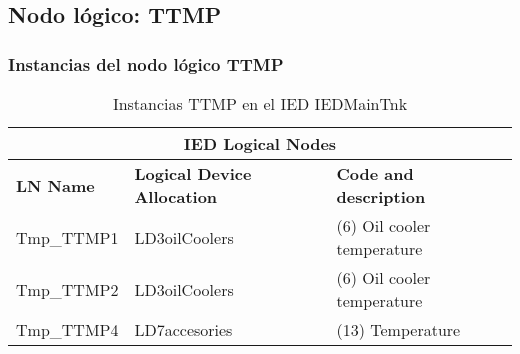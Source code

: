 
\subsection{Nodo l\'ogico: 			 TTMP}

    \subsubsection{Instancias del nodo l\'ogico TTMP}
    \begin{table}[H]
    \begin{center}
    \begin{tabular}{|l|l|p{6.8cm}|}
            \hline
            \multicolumn{3}{|c|}{\cellcolor[gray]{0.8} \textbf{IED Logical Nodes} } \\
            \hline
            \textbf{LN Name} & \textbf{Logical Device Allocation} & \textbf{Code and description} \\
            \hline
            Tmp\_TTMP1 & LD3oilCoolers & (6) Oil cooler temperature \\
            \hline
            Tmp\_TTMP2 & LD3oilCoolers & (6) Oil cooler temperature \\
            \hline
            Tmp\_TTMP4 & LD7accesories & (13) Temperature \\
            \hline
    \end{tabular}
    \caption{Instancias TTMP en el IED IEDMainTnk}
    \label{table:lnInstTTMP_6}
    \end{center}
    \end{table}
    
    
    
